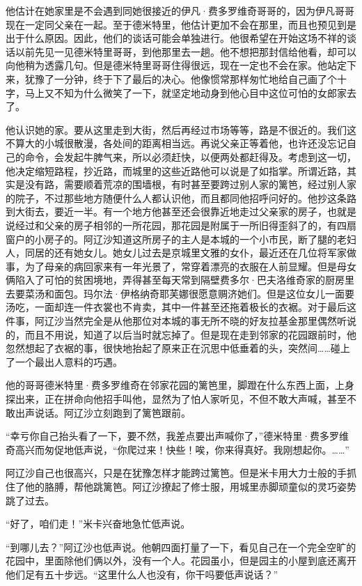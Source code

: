 \par 他估计在她家里是不会遇到同她很接近的伊凡·费多罗维奇哥哥的，因为伊凡哥哥现在一定同父亲在一起。至于德米特里，他估计更加不会在那里，而且也预见到是出于什么原因。因此，他们的谈话可能会单独进行。他很希望在开始这场不祥的谈话以前先见一见德米特里哥哥，到他那里去一趟。他不想把那封信给他看，却可以向他稍为透露几句。但是德米特里哥哥住得很远，现在一定也不会在家。他站定下来，犹豫了一分钟，终于下了最后的决心。他像惯常那样匆忙地给自己画了个十字，马上又不知为什么微笑了一下，就坚定地动身到他心目中这位可怕的女郎家去了。
\par 他认识她的家。要从这里走到大街，然后再经过市场等等，路是不很近的。我们这不算大的小城很散漫，各处间的距离相当远。再说父亲正等着他，也许还没忘记自己的命令，会发起牛脾气来，所以必须赶快，以便两处都赶得及。考虑到这一切，他决定缩短路程，抄近路，而城里的这些近路他可以说是了如指掌。所谓近路，其实是没有路，需要顺着荒凉的围墙根，有时甚至要跨过别人家的篱笆，经过别人家的院子，不过那些地方随便什么人都认识他，而且都同他招呼问好的。他抄这条路到大街去，要近一半。有一个地方他甚至还会很靠近地走过父亲家的房子，也就是说经过和父亲的房子相邻的一所花园，那花园是附属于一所旧得歪斜了的，有四扇窗户的小房子的。阿辽沙知道这所房子的主人是本城的一个小市民，断了腿的老妇人，同居的还有她女儿。她女儿过去是京城里文雅的女仆，最近还在几位将军家做事，为了母亲的病回家来有一年光景了，常穿着漂亮的衣服在人前显耀。但是母女俩陷入了可怕的贫困境地，弄得甚至每天常到隔壁费多尔·巴夫洛维奇家的厨房里去要菜汤和面包。玛尔法·伊格纳奇耶芙娜很愿意赒济她们。但是这位女儿一面要汤吃，一面却连一件衣裳也不肯卖，其中一件甚至还拖着极长的衣裾。对于最后这件事，阿辽沙当然完全是从他那位对本城的事无所不晓的好友拉基金那里偶然听说的，而且不用说，知道了以后当时就忘掉了。但是现在走到邻家的花园跟前时，他忽然想起了衣裾的事，很快地抬起了原来正在沉思中低垂着的头，突然间……碰上了一个最出人意料的巧遇。
\par 他的哥哥德米特里·费多罗维奇在邻家花园的篱笆里，脚蹬在什么东西上面，上身探出来，正在拼命向他招手叫他，显然为了怕人家听见，不但不敢大声喊，甚至不敢出声说话。阿辽沙立刻跑到了篱笆跟前。
\par “幸亏你自己抬头看了一下，要不然，我差点要出声喊你了，”德米特里·费多罗维奇高兴而匆促地低声说，“你爬过来！快些！唉，你来得真好。我刚想起你。……”
\par 阿辽沙自己也很高兴，只是在犹豫怎样才能跨过篱笆。但是米卡用大力士般的手抓住了他的胳膊，帮他跳篱笆。阿辽沙撩起了修士服，用城里赤脚顽童似的灵巧姿势跳了过去。
\par “好了，咱们走！”米卡兴奋地急忙低声说。
\par “到哪儿去？”阿辽沙也低声说。他朝四面打量了一下，看见自己在一个完全空旷的花园中，里面除他们俩以外，没有一个人。花园虽小，但是园主的小屋到底还离开他们足有五十步远。“这里什么人也没有，你干吗要低声说话？”
